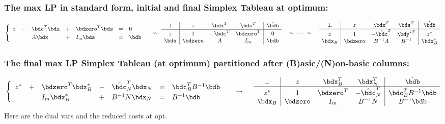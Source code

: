 \documentclass[a4paper]{article}
\begin{document}
\subsubsection*{The max LP in standard form, initial and final Simplex Tableau at optimum:}%
\[
  \begin{cases}
    \begin{array}[m]{*{5}{lc}}
    z &-& \bdc^T\bdx &+& \bdzero^T\bds &=&  0   \cr
      & &   A\bdx    &+&   I_m\bds     &=& \bdb \cr
    \end{array}
  \end{cases}
  \rightsquigarrow\;
    \begin{array}[m]{c|ccc|c}
 \perp &     z   & \bdx^T & \bds^T     & \hat\bdb \cr\hline\rule{0pt}{10pt}
    z  &     1   &-\bdc^T & \bdzero^T  &   0    \cr %
 \bds  & \bdzero & A      & I_m        & \bdb   \cr
    \end{array}
  \quad\sim\;\cdots\;\sim\quad
    \begin{array}[m]{c|ccc|c}
 \perp &     z   &     \bdx^T &     \bds^T   & \hat\bdb \cr\hline\rule{0pt}{10pt}
 z  &     1   &-\hat\bdc^T &     \bdy^{*T} & z^*\cr %
 \bdx_B& \bdzero &     B^{-1}A&     B^{-1}   & \bdx_B^*   \cr
    \end{array}
\]

\subsubsection*{The final max LP Simplex Tableau (at optimum) partitioned after (B)asic/(N)on-basic columns:}%
\[
  \begin{cases}
    \begin{array}[m]{*{5}{lc}}
      z^* &+& \bdzero^T\bdx_B^* &-& \hat\bdc_N^T\bdx_N &=&  \bdc_B^TB^{-1}\bdb \cr
      & &    I_m\bdx_B^*  &+& B^{-1}N\bdx_N     &=& B^{-1}\bdb \cr
    \end{array}
  \end{cases}
  \;\rightsquigarrow\quad\;
    \begin{array}[m]{c|ccc|c}
   \perp &     z   & \bdx_B^T  & \bdx_N^T & \hat\bdb \cr\hline\rule{0pt}{10pt}
      z^*&     1   & \bdzero^T &-\hat\bdc_N^T & \bdc_B^TB^{-1}\bdb \cr %
  \bdx_B & \bdzero &  I_m  & B^{-1}N      &  B^{-1}\bdb   \cr
    \end{array}
\]
Here  are the dual vars and
 the reduced costs at opt.
\end{document}
